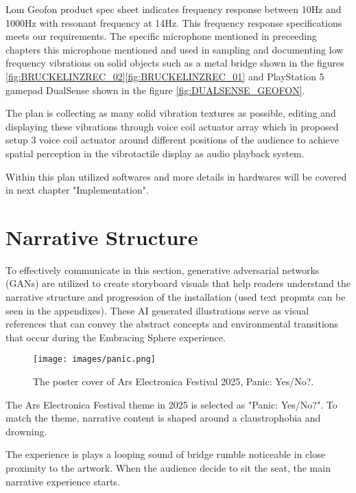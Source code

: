             Lom Geofon product spec sheet indicates frequency response between 10Hz and 1000Hz with resonant frequency at 14Hz. This frequency response specifications meets our requirements. The specific microphone mentioned in preceeding chapters this microphone mentioned and used in sampling and documenting low frequency vibrations on solid objects such as a metal bridge shown in the figures \ref{fig:BRUCKELINZREC_02}\ref{fig:BRUCKELINZREC_01} and PlayStation 5 gamepad DualSense shown in the figure \ref{fig:DUALSENSE_GEOFON}.\par

            The plan is collecting as many solid vibration textures as possible, editing and displaying these vibrations through voice coil actuator array which in proposed setup 3 voice coil actuator around different positions of the audience to achieve spatial perception in the vibrotactile display as audio playback system.\par

            Within this plan utilized softwares and more details in hardwares will be covered in next chapter "Implementation".\par
    \section{Narrative Structure}
        To effectively communicate in this section, generative adversarial networks (GANs) are utilized to create storyboard visuals that help readers understand the narrative structure and progression of the installation (used text propmts can be seen in the appendixes). These AI generated illustrations serve as visual references that can convey the abstract concepts and environmental transitions that occur during the Embracing Sphere experience.\par

        \begin{figure}[H]
            \centering
            \texttt{[image: images/panic.png]}
            \caption{The poster cover of Ars Electronica Festival 2025, Panic: Yes/No?.}
            \label{fig:PANIC}
        \end{figure}

        The Ars Electronica Festival theme in 2025 is selected as "Panic: Yes/No?". To match the theme, narrative content is shaped around a claustrophobia and drowning.\par

        The experience is plays a looping sound of bridge rumble noticeable in close proximity to the artwork. When the audience decide to sit the seat, the main narrative experience starts.\par

